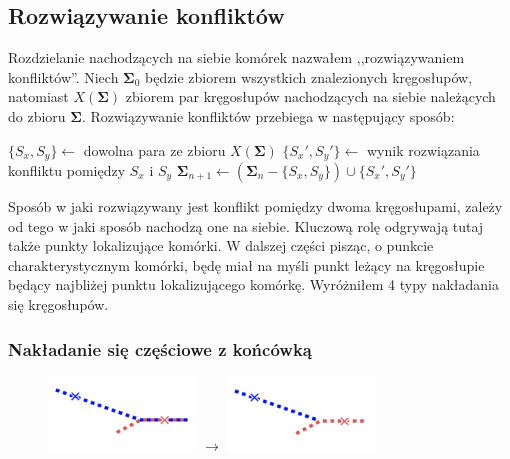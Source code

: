 \documentclass[declaration,shortabstract,mgr]{iithesis}
\begin{document}
\subsection{Rozwiązywanie konfliktów}

Rozdzielanie nachodzących na siebie komórek nazwałem ,,rozwiązywaniem konfliktów''. Niech $\mathbf{\Sigma}_0$ będzie zbiorem wszystkich znalezionych kręgosłupów, natomiast $X(\mathbf{\Sigma})$ zbiorem par kręgosłupów nachodzących na siebie należących do zbioru $\mathbf{\Sigma}$. Rozwiązywanie konfliktów przebiega w następujący sposób:

\begin{algorithmic}

  \STATE $\{S_x, S_y\} \gets$ dowolna para ze zbioru $X(\mathbf{\Sigma})$
  \STATE $\{S_x', S_y'\} \gets$ wynik rozwiązania konfliktu pomiędzy $S_x$ i $S_y$
  \STATE $\mathbf{\Sigma}_{n+1} \gets (\mathbf{\Sigma}_n - \{S_x, S_y\}) \cup \{S_x', S_y'\}$
\ENDWHILE

\end{algorithmic}

Sposób w jaki rozwiązywany jest konflikt pomiędzy dwoma kręgosłupami, zależy od tego w jaki sposób nachodzą one na siebie. Kluczową rolę odgrywają tutaj także punkty lokalizujące komórki. W dalszej części pisząc, o punkcie charakterystycznym komórki, będę miał na myśli punkt leżący na kręgosłupie będący najbliżej punktu lokalizującego komórkę. Wyróżniłem 4 typy nakładania się kręgosłupów.

\subsubsection{Nakładanie się częściowe z końcówką}

\begin{figure}[h]
  \centering
  \includegraphics[valign=m,width=0.35\textwidth]{images/overlap-pwv.png}
  $\rightarrow$
  \includegraphics[valign=m,width=0.35\textwidth]{images/overlap-pwv-solved.png}
\end{figure}
\end{document}
